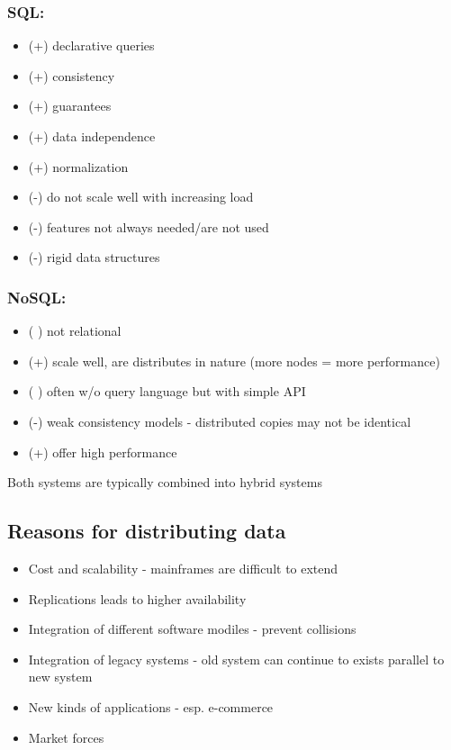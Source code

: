 \documentclass[10pt,a4paper]{article}
\begin{document}
\subsubsection{SQL:}
	\begin{itemize}
		\item (+) declarative queries
		\item (+) consistency
		\item (+) guarantees
		\item (+) data independence
		\item (+) normalization
		\item (-) do not scale well with increasing load
		\item (-) features not always needed/are not used
		\item (-) rigid data structures
	\end{itemize}
\subsubsection{NoSQL:}
	\begin{itemize}
		\item ( ) not relational
		\item (+) scale well, are distributes in nature (more nodes = more
		performance)
		\item ( ) often w/o query language but with simple API
		\item (-) weak consistency models - distributed copies may not be identical
		\item (+) offer high performance
	\end{itemize}
	
	Both systems are typically combined into hybrid systems
	
\subsection{Reasons for distributing data}
	\begin{itemize}
		\item Cost and scalability - mainframes are difficult to extend
		\item Replications leads to higher availability
		\item Integration of different software modiles - prevent collisions
		\item Integration of legacy systems - old system can continue to exists parallel to new system
		\item New kinds of applications - esp. e-commerce
		\item Market forces
	\end{itemize}
	
\end{document}
